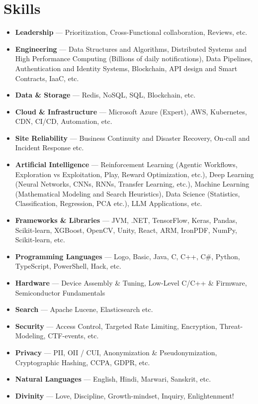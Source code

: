 \documentclass[a4paper,11pt]{article}
\newcommand{\resumeItemListStart}{\begin{itemize}[label=$\circ$,leftmargin=0.15in,itemsep=1.0mm]}
\newcommand{\resumeItemListEnd}{\end{itemize}\vspace{1mm}}
\begin{document}
\section{\Large{\textbf{Skills}}}
\vspace{2mm}
\resumeItemListStart
    \item \textbf{Leadership} — Prioritization, Cross-Functional collaboration, Reviews, etc.
    \item \textbf{Engineering} — Data Structures and Algorithms, Distributed Systems and High Performance Computing (Billions of daily notifications), Data Pipelines, Authentication and Identity Systems, Blockchain, API design and Smart Contracts, IaaC, etc.
    \item \textbf{Data \& Storage} — Redis, NoSQL, SQL, Blockchain, etc. 
    \item \textbf{Cloud \& Infrastructure} — Microsoft Azure (Expert), AWS, Kubernetes, CDN, CI/CD, Automation, etc.
    \item \textbf{Site Reliability} — Business Continuity and Disaster Recovery, On-call and Incident Response etc.
    \item \textbf{Artificial Intelligence} — Reinforcement Learning (Agentic Workflows, Exploration vs Exploitation, Play, Reward Optimization, etc.), Deep Learning (Neural Networks, CNNs, RNNs, Transfer Learning, etc.), Machine Learning (Mathematical Modeling and Search Heuristics), Data Science (Statistics, Classification, Regression, PCA etc.), LLM Applications, etc.
    \item \textbf{Frameworks \& Libraries} — JVM, .NET,  TensorFlow, Keras, Pandas, Scikit-learn, XGBoost, OpenCV, Unity, React, ARM, IronPDF, NumPy, Scikit-learn, etc.
    \item \textbf{Programming Languages} — Logo, Basic, Java, C, C++, C\#, Python, TypeScript, PowerShell, Hack, etc.
    \item \textbf{Hardware} — Device Assembly & Tuning, Low-Level C/C++ & Firmware, Semiconductor Fundamentals 
    \item \textbf{Search} — Apache Lucene, Elasticsearch etc.
    \item \textbf{Security} — Access Control, Targeted Rate Limiting, Encryption, Threat-Modeling, CTF-events, etc.
    \item \textbf{Privacy} — PII, OII / CUI, Anonymization \& Pseudonymization, Cryptographic Hashing, CCPA, GDPR, etc.
    \item \textbf{Natural Languages} — English, Hindi, Marwari, Sanskrit, etc.
    \item \textbf{Divinity} — Love, Discipline, Growth-mindset, Inquiry, Enlightenment!
\resumeItemListEnd
\end{document}
